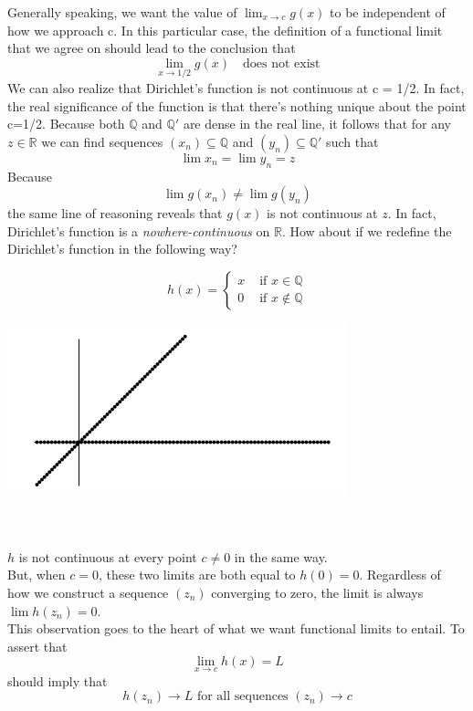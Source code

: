 \documentclass[12pt]{article}
\begin{document}
Generally speaking, we want the value of $\lim_{x \to c} g(x)$ to be independent of how we approach c. In this particular case, the definition of a functional limit that we agree on should lead to the conclusion that \[
    \lim_{x \to 1/2} g(x) \quad\text{does not exist}
\]
We can also realize that Dirichlet's function is not continuous at c = 1/2. In fact, the real significance of the function is that there's nothing unique about the point c=1/2. Because both $\mathbb{Q}$ and $\mathbb{Q}'$ are dense in the real line, it follows that for any $z \in \mathbb{R}$ we can find sequences $(x_n) \subseteq \mathbb{Q}$ and $(y_n) \subseteq \mathbb{Q}'$ such that \[
    \lim x_n = \lim y_n = z
\]
Because \[
    \lim g(x_n) \neq \lim g(y_n)
\]
the same line of reasoning reveals that $g(x)$ is not continuous at $z$. In fact, Dirichlet's function is a \textit{nowhere-continuous} on $\mathbb{R}$.
How about if we redefine the Dirichlet's function in the following way? \\
\begin{minipage}{0.45\textwidth}
    \begin{equation*}
        h(x) = 
        \begin{cases}
            x & \text{ if } x \in \mathbb{Q} \\
            0 & \text{ if } x \notin \mathbb{Q}
        \end{cases}
    \end{equation*}
\end{minipage}
\begin{minipage}{0.45\textwidth}
    \centering
    \includegraphics[scale=0.4]{Dirichlet h_x.png}
\end{minipage} \\~\\
$h$ is not continuous at every point $c \neq 0$ in the same way. \\
But, when $c=0$, these two limits are both equal to $h(0)=0$. Regardless of how we construct a sequence $(z_n)$ converging to zero, the limit is always $\lim h(z_n)=0$. \\
This observation goes to the heart of what we want functional limits to entail. To assert that \[
    \lim_{x \to c} h(x) = L
\]
should imply that \[
    h(z_n) \to L \text{ for all sequences } (z_n) \to c
\]
\end{document}
